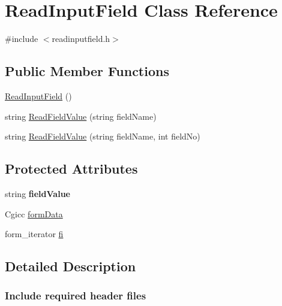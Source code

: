 \hypertarget{classReadInputField}{\section{Read\-Input\-Field Class Reference}
\label{classReadInputField}
}


{\ttfamily \#include $<$readinputfield.\-h$>$}

\subsection*{Public Member Functions}
\begin{DoxyCompactItemize}
\item 
\hyperlink{classReadInputField_aae743343381035c28a3a0111fc353c7f}{Read\-Input\-Field} ()
\item 
string \hyperlink{classReadInputField_a7f6e49b47412649644cc644927ccc682}{Read\-Field\-Value} (string field\-Name)
\item 
string \hyperlink{classReadInputField_accf7ceba77721a35968c69268e4e559e}{Read\-Field\-Value} (string field\-Name, int field\-No)
\end{DoxyCompactItemize}
\subsection*{Protected Attributes}
\begin{DoxyCompactItemize}
\item 
\hypertarget{classReadInputField_a0d95496b5fc8fb4badd4af19492182ae}{string {\bfseries field\-Value}}\label{classReadInputField_a0d95496b5fc8fb4badd4af19492182ae}

\item 
Cgicc \hyperlink{classReadInputField_a1e4ebac8979fd9b2771320d669fce5fc}{form\-Data}
\item 
form\-\_\-iterator \hyperlink{classReadInputField_ae252dc321be04c2c1afa6928ad16a45d}{fi}
\end{DoxyCompactItemize}


\subsection{Detailed Description}


 \subsubsection*{Include required header files}



